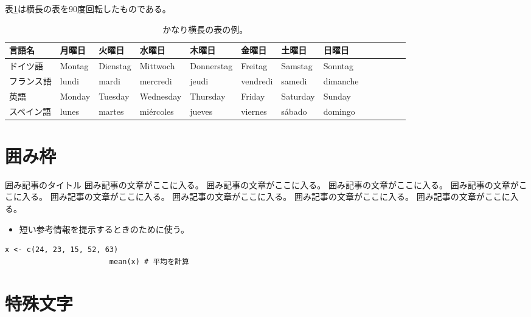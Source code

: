 \documentclass[ %
	uplatex,%
	a5paper,%
	papersize%
	]{jsbook}
\newcommand{\sanko}[1]{%
					\begin{itemize}
						\item[\mysbox{\small\gtfamily 参考}] #1
					\end{itemize}
					}
\begin{document}
						表\ref{tb:wide-table-example}は横長の表を90度回転したものである。

						\begin{landscape}
							\begin{table}
								\caption{かなり横長の表の例。}
								\label{tb:wide-table-example}
								\begin{center}
									\begin{tabular}{lllllllllllll} \toprule
										言語名   & 月曜日     & 火曜日      & 水曜日       & 木曜日        & 金曜日       & 土曜日      & 日曜日      \\ \midrule
										ドイツ語  & Montag  & Dienstag & Mittwoch  & Donnerstag & Freitag   & Samstag  & Sonntag  \\
										フランス語 & lundi   & mardi    & mercredi  & jeudi      & vendredi  & samedi   & dimanche \\
										英語    & Monday  & Tuesday  & Wednesday & Thursday   & Friday    & Saturday & Sunday   \\
										スペイン語 & lunes   & martes   & miércoles & jueves     & viernes   & sábado   & domingo  \\ \bottomrule
									\end{tabular}
								\end{center}
							\end{table}
						\end{landscape}

						\section{囲み枠}

						\begin{note}{囲み記事のタイトル}
							囲み記事の文章がここに入る。
							囲み記事の文章がここに入る。
							囲み記事の文章がここに入る。
							囲み記事の文章がここに入る。
							囲み記事の文章がここに入る。
							囲み記事の文章がここに入る。
							囲み記事の文章がここに入る。
							囲み記事の文章がここに入る。
						\end{note}


						\sanko{短い参考情報を提示するときのために使う。}

						\begin{lstlisting}[caption=簡単なプログラムの例, label=ls:example]
						x <- c(24, 23, 15, 52, 63)
						mean(x) # 平均を計算
						\end{lstlisting}


						\section{特殊文字}
\end{document}
